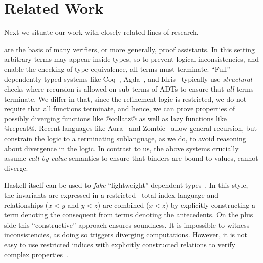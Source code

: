 \section{Related Work}\label{sec:related}

Next we situate our work with closely related lines of research.

 are the basis of many verifiers, 
or more generally, proof assistants.
%
In this setting arbitrary terms may appear inside types,
so to prevent logical inconsistencies, and enable
the checking of type equivalence, all terms must
terminate.
%
``Full'' dependently typed systems like Coq~\cite{coq-book}, 
Agda~\cite{norell07}, and Idris~\cite{Brady13} typically use 
\emph{structural} checks where recursion is allowed on 
sub-terms of ADTs to ensure that \emph{all} terms terminate.
%
We differ in that, since the refinement logic is
restricted, we do not require that all functions terminate,
and hence, we can prove properties of possibly diverging 
functions like @collatz@ as well as lazy functions like @repeat@.
%
Recent languages like Aura~\citep{AURA} and Zombie~\citep{Zombie}
allow general recursion, but constrain the logic to a terminating 
sublanguage, as we do, to avoid reasoning 
about divergence in the logic.
%
In contrast to us, the above systems crucially assume 
\emph{call-by-value} semantics to ensure that binders are bound
to values, \ie cannot diverge.




%
   Haskell itself can be used to \emph{fake} ``lightweight'' dependent 
   types~\citep{ChakravartyKJ05,JonesVWW06,Weirich12}.
   In this style, the invariants are expressed in 
   a restricted~\citep{Jia10} total 
   index language and relationships (\eg $x<y$ and $y<z$) 
   are combined (\eg $x<z$) by explicitly constructing
   a term denoting the consequent from terms 
   denoting the antecedents.
   On the plus side this ``constructive'' approach
   ensures soundness. 
   It is impossible to witness inconsistencies, 
   as doing so triggers diverging computations.
   However, it is not easy to use restricted indices
   with explicitly constructed relations to verify 
   complex properties~\citep{hasochism}.


